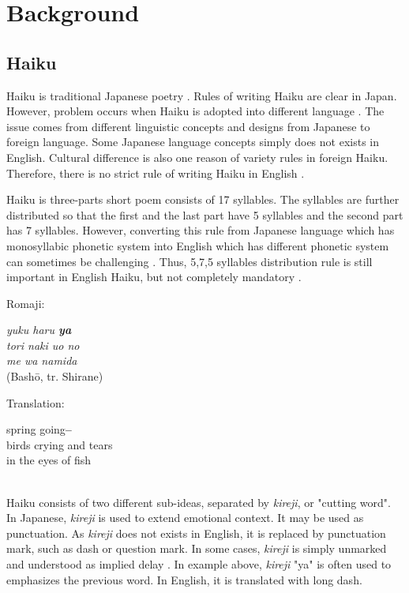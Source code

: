 \section{Background}

\subsection{Haiku}

Haiku is traditional Japanese poetry . Rules of writing Haiku are clear in Japan. However, problem occurs when Haiku is adopted into different language \cite{Haiku_poem}. The issue comes from different linguistic concepts and designs from Japanese to foreign language. Some Japanese language concepts simply does not exists in English. Cultural difference is also one reason of variety rules in foreign Haiku. Therefore, there is no strict rule of writing Haiku in English \cite{Haiku_JP}.

Haiku is three-parts short poem consists of 17 syllables. The syllables are further distributed so that the first and the last part have 5 syllables and the second part has 7 syllables. However, converting this rule from Japanese language which has monosyllabic phonetic system into English which has different phonetic system can sometimes be challenging  \cite{Haiku_poem}. Thus, 5,7,5 syllables distribution rule is still important in English Haiku, but not completely mandatory \cite{Haiku_JP}.


Romaji:
\\
{\centering\textit{
		yuku haru \textbf{ya} \\
		tori naki uo no \\
		me wa namida}  \\
	(Bashō, tr. Shirane)
	\par
}

Translation:\\
{\centering
	spring going\textbf{--} \\
	birds crying and tears \\
	in the eyes of fish
	\par
}

~\\

Haiku consists of two different sub-ideas, separated by \textit{kireji}, or "cutting word". In Japanese, \textit{kireji} is used to extend emotional context. It may be used as punctuation. As \textit{kireji} does not exists in English, it is replaced by punctuation mark, such as dash or question mark. In some cases, \textit{kireji} is simply unmarked and understood as implied delay \cite{Haiku_kireji}. In example above, \textit{kireji} "ya" is often used to emphasizes the previous word. In English, it is translated with long dash.

